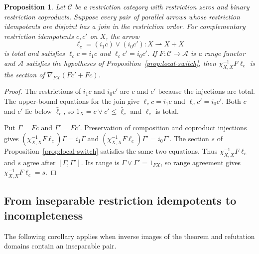 \documentclass[11pt]{article}
\newtheorem{proposition}[theorem]{Proposition}
\begin{document}
\begin{proposition}\label{prop:disjoint-joins}
Let $\mathcal C$ be a restriction category with restriction zeros and
binary restriction coproducts. Suppose every pair of parallel arrows
whose restriction idempotents are disjoint has a join in the restriction
order.
For complementary restriction idempotents $c,c'$ on $X$, the arrow
\[
 \ell_c=(i_1c)\vee(i_0c'):X\rightharpoonup X+X
\]
is total and satisfies $\ell_cc=i_1c$ and $\ell_cc'=i_0c'$.
If $F:\mathcal C\to\mathcal A$ is a range functor and $\mathcal A$
satisfies the hypotheses of Proposition~\ref{prop:local-switch},
then $\chi_{X,X}^{-1}F\ell_c$ is the section of
$\nabla_{FX}(Fc'+Fc)$.
\end{proposition}
\begin{proof}
The restrictions of $i_1c$ and $i_0c'$ are $c$ and $c'$ because
the injections are total. The upper-bound equations for the join
give $\ell_cc=i_1c$ and $\ell_cc'=i_0c'$.
Both $c$ and $c'$ lie below $\bar\ell_c$, so
$1_X=c\vee c'\le\bar\ell_c$ and $\ell_c$ is total.

Put $\Gamma=Fc$ and $\Gamma'=Fc'$. Preservation of composition
and coproduct injections gives
$(\chi_{X,X}^{-1}F\ell_c)\Gamma=i_1\Gamma$ and
$(\chi_{X,X}^{-1}F\ell_c)\Gamma'=i_0\Gamma'$.
The section $s$ of Proposition~\ref{prop:local-switch} satisfies the
same two equations. Thus $\chi_{X,X}^{-1}F\ell_c$ and $s$ agree after
$[\Gamma,\Gamma']$. Its range is
$\Gamma\vee\Gamma'=1_{FX}$, so range agreement gives
$\chi_{X,X}^{-1}F\ell_c=s$.
\end{proof}

\subsection{From inseparable restriction idempotents to incompleteness}

The following corollary applies when inverse images of the theorem
and refutation domains contain an inseparable pair.
\end{document}
